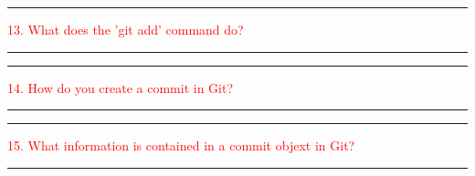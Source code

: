 \documentclass{article}
\begin{document}
\noindent
{\color{red} \rule{\linewidth}{0.5mm}}
\textcolor{red}{13. What does the 'git add' command do?} \\
\noindent
{\color{red} \rule{\linewidth}{0.5mm}}


\noindent
{\color{red} \rule{\linewidth}{0.5mm}}
\textcolor{red}{14. How do you create a commit in Git?} \\
\noindent
{\color{red} \rule{\linewidth}{0.5mm}}


\noindent
{\color{red} \rule{\linewidth}{0.5mm}}
\textcolor{red}{15. What information is contained in a commit objext in Git?} \\
\noindent
{\color{red} \rule{\linewidth}{0.5mm}}
\end{document}

